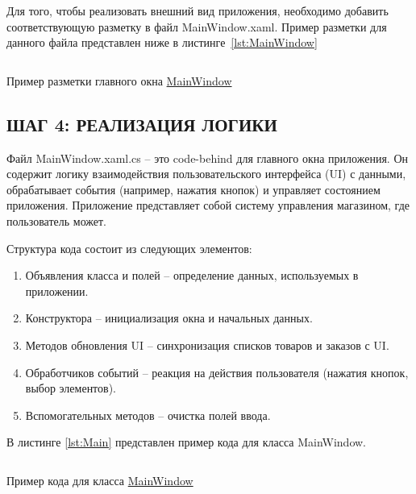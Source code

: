\documentclass[12pt]{article}
\newcommand{\colorGIT}[1]{\textcolor{CtpLavender}{#1}}
\renewcommand{\texttt}[1]{{\small\ttfamily #1}}
\begin{document}
Для того, чтобы реализовать внешний вид приложения, необходимо добавить
соответствующую разметку в файл \texttt{MainWindow.xaml}.
Пример разметки для данного файла представлен ниже в листинге~\ref{lst:MainWindow}

\begin{listing}[H]
	\inputminted[firstline=8, lastline=51]{xml}{../../3lab/StoreManager/MainWindow.xaml}
	\caption{Пример разметки главного окна \colorGIT{\href{https://github.com/WebMasterIT/Csharp_Labs/blob/ec375afd16c0647b337cf3d8a79c8bef904fc1be/3lab/StoreManager/MainWindow.xaml\#L1-L200}{MainWindow}}}
	\label{lst:MainWindow}
\end{listing}

\newpage

\subsection{ШАГ 4: РЕАЛИЗАЦИЯ ЛОГИКИ}

Файл \texttt{MainWindow.xaml.cs} -- это \texttt{code-behind} для главного окна приложения. Он содержит логику взаимодействия пользовательского интерфейса (\texttt{UI}) с данными, обрабатывает события (например, нажатия кнопок) и управляет состоянием приложения. Приложение представляет собой систему управления магазином, где пользователь может.

Структура кода состоит из следующих элементов:
\begin{enumerate}
	\item Объявления класса и полей -- определение данных, используемых в приложении.
	\item Конструктора -- инициализация окна и начальных данных.
	\item Методов обновления \texttt{UI} -- синхронизация списков товаров и заказов с \texttt{UI}.
	\item Обработчиков событий -- реакция на действия пользователя (нажатия кнопок, выбор элементов).
	\item Вспомогательных методов -- очистка полей ввода.
\end{enumerate}
В листинге \ref{lst:Main} представлен пример кода для класса \texttt{MainWindow}.

\begin{listing}[H]
	\inputminted[firstline=1, lastline=21]{csharp}{../../3lab/StoreManager/MainWindow.xaml.cs}
	\caption{Пример кода для класса \colorGIT{\href{https://github.com/WebMasterIT/Csharp_Labs/blob/ec375afd16c0647b337cf3d8a79c8bef904fc1be/3lab/StoreManager/MainWindow.xaml.cs\#L1-L21}{MainWindow}}}
	\label{lst:Main}
\end{listing}
\end{document}
